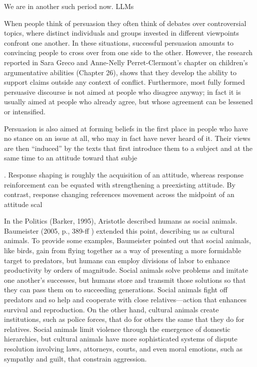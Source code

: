 \documentclass{article} %
\begin{document}
We are in another such period now. LLMs



When people
think of persuasion they often think of debates over controversial topics, where distinct individuals
and groups invested in different viewpoints confront one another. In these situations,
successful persuasion amounts to convincing people to cross over from one side to the other.
However, the research reported in Sara Greco and Anne-Nelly Perret-Clermont’s chapter on
children’s argumentative abilities (Chapter 26), shows that they develop the ability to support
claims outside any context of conflict. Furthermore, most fully formed persuasive discourse
is not aimed at people who disagree anyway; in fact it is usually aimed at people who already
agree, but whose agreement can be lessened or intensified.

Persuasion is also aimed at forming beliefs in the first place in people who have no stance
on an issue at all, who may in fact have never heard of it. Their views are then “induced” by
the texts that first introduce them to a subject and at the same time to an attitude toward that
subje

. Response shaping is roughly the acquisition of an attitude, whereas response reinforcement can be equated with strengthening a preexisting attitude. By contrast, response changing references movement across the midpoint of an attitude scal




In the Politics (Barker, 1995), Aristotle described humans as social animals. Baumeister
(2005, p., 389-ff ) extended this point, describing us as cultural animals. To provide
some examples, Baumeister pointed out that social animals, like birds, gain from flying
together as a way of presenting a more formidable target to predators, but humans can
employ divisions of labor to enhance productivity by orders of magnitude. Social animals
solve problems and imitate one another’s successes, but humans store and transmit
those solutions so that they can pass them on to succeeding generations. Social animals
fight off predators and so help and cooperate with close relatives—action that enhances
survival and reproduction. On the other hand, cultural animals create institutions, such
as police forces, that do for others the same that they do for relatives. Social animals
limit violence through the emergence of domestic hierarchies, but cultural animals have
more sophisticated systems of dispute resolution involving laws, attorneys, courts, and
even moral emotions, such as sympathy and guilt, that constrain aggression.
\end{document}
